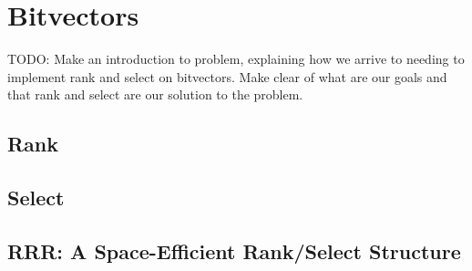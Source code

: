 \clearpage
\section{Bitvectors}

TODO: Make an introduction to problem, explaining how we arrive to needing to implement rank and select on bitvectors. Make clear of what are our goals and that rank and select are our solution to the problem.

\subsection{Rank}
\subsection{Select}
\subsection{RRR: A Space-Efficient Rank/Select Structure}
